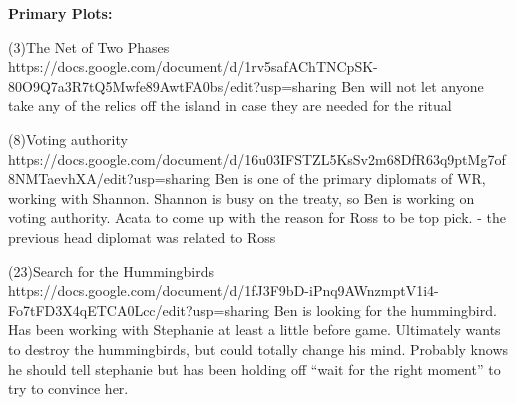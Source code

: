 \documentclass[char]{GL2020}
\begin{document}
\name{\cJuniorStatesman{}}








\textbf{Primary Plots:}

(3)The Net of Two Phases https://docs.google.com/document/d/1rv5safAChTNCpSK-80O9Q7a3R7tQ5Mwfe89AwtFA0bs/edit?usp=sharing
Ben will not let anyone take any of the relics off the island in case they are needed for the ritual

(8)Voting authority https://docs.google.com/document/d/16u03IFSTZL5KsSv2m68DfR63q9ptMg7of8NMTaevhXA/edit?usp=sharing
Ben is one of the primary diplomats of WR, working with Shannon.  Shannon is busy on the treaty, so Ben is working on voting authority.  Acata to come up with the reason for Ross to be top pick. - the previous head diplomat was related to Ross

(23)Search for the Hummingbirds  https://docs.google.com/document/d/1fJ3F9bD-iPnq9AWnzmptV1i4-Fo7tFD3X4qETCA0Lcc/edit?usp=sharing
Ben is looking for the hummingbird. Has been working with Stephanie at least a little before game.  Ultimately wants to destroy the hummingbirds, but could totally change his mind. Probably knows he should tell stephanie but has been holding off “wait for the right moment” to try to convince her.
\end{document}
